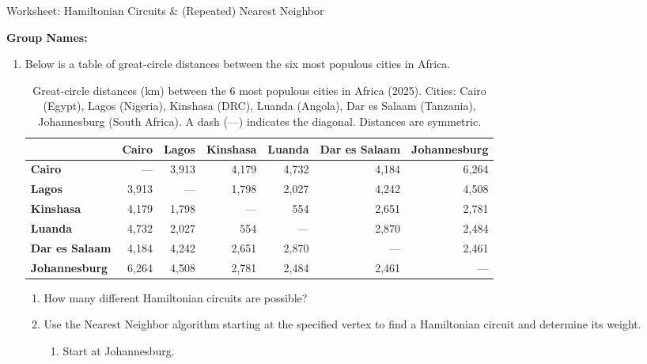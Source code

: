 \documentclass[12pt]{article}
\begin{document}
\begin{center}
{\Large  Worksheet:  Hamiltonian Circuits \& (Repeated) Nearest Neighbor	}
\end{center}



\noindent \textbf{Group Names:} \hrulefill \\
\begin{enumerate}
\item Below is a table of great-circle distances between the six most populous cities in Africa. \begin{table}[h]
\centering
\caption{Great-circle distances (km) between the 6 most populous cities in Africa (2025).
         Cities: Cairo (Egypt), Lagos (Nigeria), Kinshasa (DRC),
         Luanda (Angola), Dar es Salaam (Tanzania), Johannesburg (South Africa).
         A dash (---) indicates the diagonal. Distances are symmetric.}
\vspace{6pt}
\begin{tabular}{lrrrrrr}
\toprule
 & \textbf{Cairo} & \textbf{Lagos} & \textbf{Kinshasa} & \textbf{Luanda} & \textbf{Dar es Salaam} & \textbf{Johannesburg} \\
\midrule
\textbf{Cairo}          & ---   & 3{,}913 & 4{,}179 & 4{,}732 & 4{,}184 & 6{,}264 \\
\textbf{Lagos}          & 3{,}913 & ---   & 1{,}798 & 2{,}027 & 4{,}242 & 4{,}508 \\
\textbf{Kinshasa}       & 4{,}179 & 1{,}798 & ---   &   554 & 2{,}651 & 2{,}781 \\
\textbf{Luanda}         & 4{,}732 & 2{,}027 &   554 & ---   & 2{,}870 & 2{,}484 \\
\textbf{Dar es Salaam}  & 4{,}184 & 4{,}242 & 2{,}651 & 2{,}870 & ---   & 2{,}461 \\
\textbf{Johannesburg}   & 6{,}264 & 4{,}508 & 2{,}781 & 2{,}484 & 2{,}461 & ---   \\
\bottomrule
\end{tabular}
\end{table}
\begin{enumerate}
\item How many different Hamiltonian circuits are possible?
\vspace{1in}
\item Use the Nearest Neighbor algorithm starting at the specified vertex to find a Hamiltonian circuit and determine its weight. 
	\begin{enumerate}
	\item Start at Johannesburg.


\end{enumerate}
\end{enumerate}
\end{enumerate}
\end{document}
